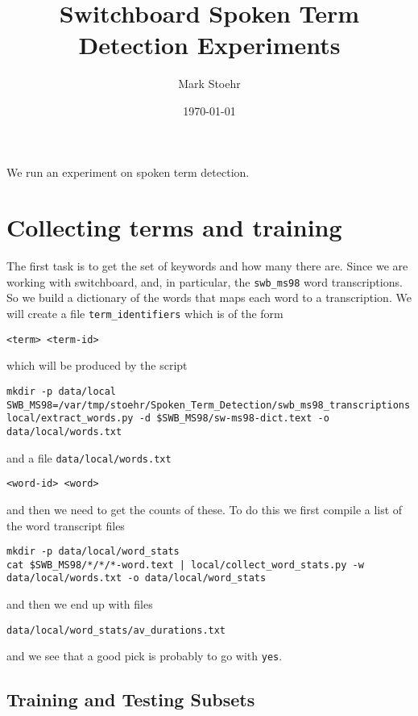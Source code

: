 \documentclass{article}
\title{Switchboard Spoken Term Detection Experiments}
\author{Mark Stoehr}
\date{\today}
\begin{document}
\maketitle

We run an experiment on spoken term detection.

\section{Collecting terms and training}

The first task is to get the set of keywords and how many there are.
Since we are working with switchboard, and, in particular, the
\texttt{swb\_ms98} word transcriptions.  So we build a dictionary of
the words that maps each word to a transcription.
We will create a file \texttt{term\_identifiers} which is of the form
\begin{verbatim}
<term> <term-id>
\end{verbatim}
which will be produced by the script
\begin{verbatim}
mkdir -p data/local
SWB_MS98=/var/tmp/stoehr/Spoken_Term_Detection/swb_ms98_transcriptions
local/extract_words.py -d $SWB_MS98/sw-ms98-dict.text -o data/local/words.txt
\end{verbatim}
and a file \texttt{data/local/words.txt}
\begin{verbatim}
<word-id> <word>
\end{verbatim}
and then we need to get the counts of these. To do this we first
compile a list of the word transcript files
\begin{verbatim}
mkdir -p data/local/word_stats
cat $SWB_MS98/*/*/*-word.text | local/collect_word_stats.py -w data/local/words.txt -o data/local/word_stats
\end{verbatim}
and then we end up with files
\begin{verbatim}
data/local/word_stats/av_durations.txt
\end{verbatim} 
and we see that a good pick is probably to go with 
\texttt{yes}.

\subsection{Training and Testing Subsets}
\end{document}

